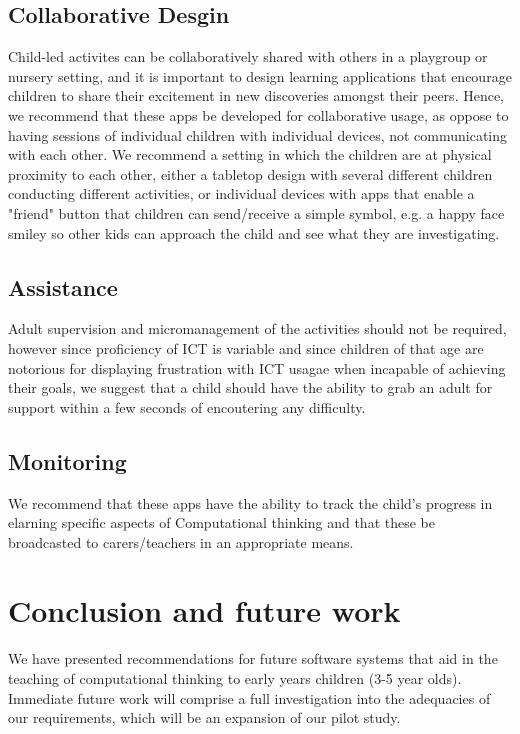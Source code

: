 \documentclass{sig-alternate}
\begin{document}
\subsection*{Collaborative Desgin} 
Child-led activites can be collaboratively shared with others in a playgroup or nursery setting, and it is important to design learning applications that encourage children to share their excitement in new discoveries amongst their peers. Hence, we recommend that these apps be developed for collaborative usage, as oppose to having sessions of individual children with individual devices, not communicating with each other. We recommend a setting in which the children are at physical proximity to each other,  either a tabletop design with several different children conducting different activities, or individual devices with apps that enable a "friend" button that children can send/receive a simple symbol, e.g. a happy face smiley so other kids can approach the child and see what they are investigating. 
\subsection*{Assistance}
Adult supervision and micromanagement of the activities should not be required, however since proficiency of ICT is variable and since children of that age are notorious for displaying frustration with ICT  usagae when incapable of achieving their goals, we suggest that a child should have the ability to grab an adult for support within a few seconds of encoutering any difficulty.
\subsection*{Monitoring}
We recommend that these apps have the ability to track the child's progress in elarning specific aspects of Computational thinking and that these be broadcasted to carers/teachers in an appropriate means. 

\section{Conclusion and future work}
We have presented recommendations for future software systems that aid in the teaching of computational thinking to early years children (3-5 year olds). Immediate future work will comprise a full investigation into the adequacies of our requirements, which will be an expansion of our pilot study.


\end{document}
